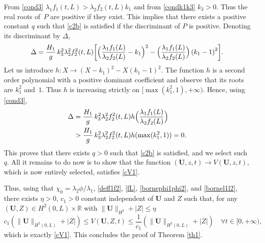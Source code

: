 \documentclass[JEP,XML,SOM,Unicode]{cedram}
\theoremstyle{definition}
\begin{document}
From \eqref{cond3} $\lambda_{1}f_{1}(t,L)>\lambda_{2}f_{2}(t,L)k_{1}$ and from \eqref{condk1k3} $k_{3}>0$. Thus the real roots of~$P$ are positive if they exist. This implies that there exists a positive constant $q$ such that \eqref{c2b} is satisfied if the discriminant of $P$
is positive. Denoting its discriminant by $\Delta$,
\begin{equation*}
\Delta=\frac{H_{1}}{g}\,k_{3}^{2}\lambda_{2}^{2}f_{2}^{2}(t,L)\biggl[\Bigl(\frac{\lambda_{1}f_{1}(L)}{\lambda_{2}f_{2}(L)}-k_{1} \Bigr)^{2}-\Bigl(\frac{\lambda_{1}f_{1}(L)}{\lambda_{2}f_{2}(L)} \Bigr)\left(k_{1}-1\right)^{2}\biggr].
\end{equation*}
Let us introduce $h:X\to (X-k_{1})^{2}-X(k_{1}-1)^{2}$. The function $h$ is a second order polynomial with a positive dominant coefficient and observe that its roots are
$k_{1}^{2}$ and~$1$. Thus
$h$ is increasing strictly on $[\max(k_{1}^{2},1),+\infty)$.
Hence, using \eqref{cond3},
\begin{equation*}
\begin{split}
\Delta&=\frac{H_{1}}{g}\,k_{3}^{2}\lambda_{2}^{2}f_{2}^{2}(t,L)h \Bigl(\frac{\lambda_{1}f_{1}(L)}{\lambda_{2}f_{2}(L)} \Bigr)\\
&>\frac{H_{1}}{g}\,k_{3}^{2}\lambda_{2}^{2}f_{2}^{2}(t,L)h(\max(k_{1}^{2},1))
=0.
\end{split}
\end{equation*}
This proves that there exists $q>0$ such that \eqref{c2b} is satisfied, and we select such $q$.
All it remains to do now is to show that the function $(\boldsymbol{U},z,{t})\to V(\boldsymbol{U},z,{t})$, which is now entirely selected, satisfies \eqref{cV1}.

Thus, using that $\chi_{0}=\lambda_{2}\phi/\lambda_{1}$, \eqref{deff1f2}, \eqref{fL}, \eqref{bornephi1phi2}, and \eqref{bornel1l2}, there exists $\eta>0$, $c_{1}>0$ constant independent of $\boldsymbol{U}$ and ${Z}$ such that, for any $(\boldsymbol{U},{Z})\in H^{2}(0,L)\times \mathbb{R}$ {with $\|\boldsymbol{U}\|_{H^{2}}+|Z|\leq \eta$}
\begin{equation*}
c_{1}\left(\lVert \boldsymbol{U}\rVert_{H^{2}(0,L)}+|Z|\right) \leq V(\boldsymbol{U},Z,{t})\leq \frac{1}{c_{1}}\left(\lVert \boldsymbol{U}\rVert_{H^{2}(0,L)}+|Z|\right)\quad\forall t\in[0,+\infty),
\end{equation*}
which is exactly \eqref{cV1}. This concludes the proof of Theorem \ref{th1}.
\end{document}
